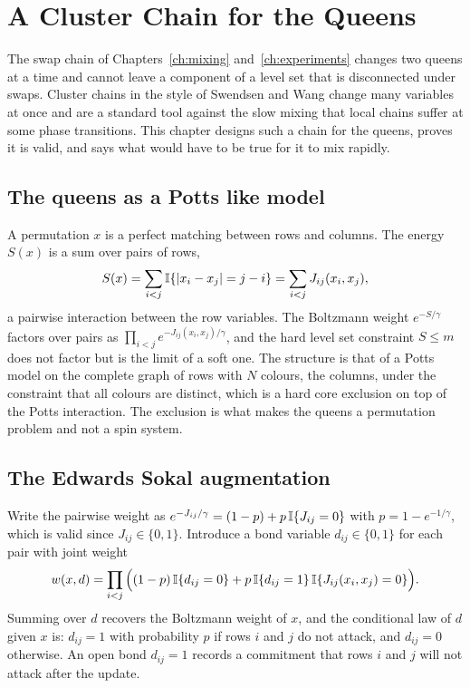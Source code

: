 \chapter{A Cluster Chain for the Queens}
\label{ch:swendsen}

The swap chain of Chapters~\ref{ch:mixing} and~\ref{ch:experiments} changes two queens at a time and cannot leave a component of a level set that is disconnected under swaps. Cluster chains in the style of Swendsen and Wang change many variables at once and are a standard tool against the slow mixing that local chains suffer at some phase transitions. This chapter designs such a chain for the queens, proves it is valid, and says what would have to be true for it to mix rapidly.

\section{The queens as a Potts like model}

A permutation $x$ is a perfect matching between rows and columns. The energy $S(x)$ is a sum over pairs of rows,
\[
S(x) = \sum_{i < j} \mathbb{I}\{ |x_i - x_j| = j - i \} = \sum_{i < j} J_{ij}(x_i, x_j) ,
\]
a pairwise interaction between the row variables. The Boltzmann weight $e^{-S/\gamma}$ factors over pairs as $\prod_{i<j} e^{-J_{ij}(x_i, x_j)/\gamma}$, and the hard level set constraint $S \le m$ does not factor but is the limit of a soft one. The structure is that of a Potts model on the complete graph of rows with $N$ colours, the columns, under the constraint that all colours are distinct, which is a hard core exclusion on top of the Potts interaction. The exclusion is what makes the queens a permutation problem and not a spin system.

\section{The Edwards Sokal augmentation}

Write the pairwise weight as $e^{-J_{ij}/\gamma} = (1 - p) + p \, \mathbb{I}\{ J_{ij} = 0 \}$ with $p = 1 - e^{-1/\gamma}$, which is valid since $J_{ij} \in \{0, 1\}$. Introduce a bond variable $d_{ij} \in \{0, 1\}$ for each pair with joint weight
\[
w(x, d) = \prod_{i < j} \Big( (1 - p) \, \mathbb{I}\{ d_{ij} = 0 \} + p \, \mathbb{I}\{ d_{ij} = 1 \} \, \mathbb{I}\{ J_{ij}(x_i, x_j) = 0 \} \Big) .
\]
Summing over $d$ recovers the Boltzmann weight of $x$, and the conditional law of $d$ given $x$ is: $d_{ij} = 1$ with probability $p$ if rows $i$ and $j$ do not attack, and $d_{ij} = 0$ otherwise. An open bond $d_{ij} = 1$ records a commitment that rows $i$ and $j$ will not attack after the update.

